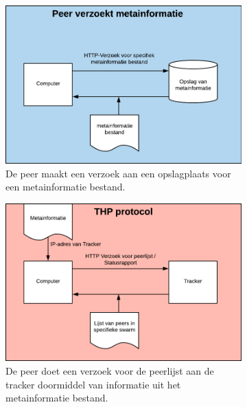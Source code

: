 \begin{figure}[h!]
	\centering
	\begin{subfigure}[b]{1\textwidth}
	\centering
		\includegraphics[scale=.4]{torrent-1.png}
		\caption[Peer metainformatie stap]{De peer maakt een verzoek aan een opslagplaats voor een metainformatie bestand.}
	\end{subfigure}%
	\hfill
	\begin{subfigure}[b]{1\textwidth}
	\centering
		\includegraphics[scale=.4]{torrent-2.png}
			\caption[THP stap]{De peer doet een verzoek voor de peerlijst aan de tracker doormiddel van informatie uit het metainformatie bestand.}
	\end{subfigure}%
	\hfill
	\begin{subfigure}{1\textwidth}
		\centering

\end{subfigure}
\end{figure}
